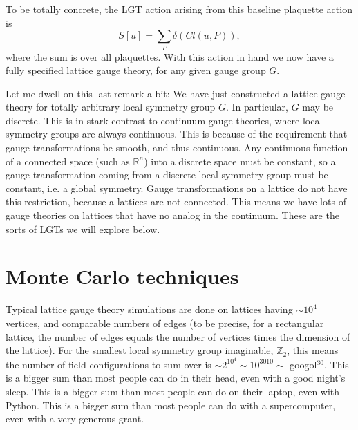 \documentclass[9pt,twocolumn,twoside]{article}
\begin{document}
To be totally concrete, the LGT action arising from this baseline plaquette action is 
\[S[u] = \sum_P \delta\left(Cl(u,P)\right),\]
where the sum is over all plaquettes.  With this action in hand we now have a fully specified lattice gauge theory, for any given gauge group $G$.  

Let me dwell on this last remark a bit: We have just constructed a lattice gauge theory for totally arbitrary local symmetry group $G$.  In particular, $G$ may be discrete.  This is in stark contrast to continuum gauge theories, where local symmetry groups are always continuous.  This is because of the requirement that gauge transformations be smooth, and thus continuous.  Any continuous function of a connected space (such as $\mathbb{R}^n$) into a discrete space must be constant, so a gauge transformation coming from a discrete local symmetry group must be constant, i.e. a global symmetry.  Gauge transformations on a lattice do not have this restriction, because a lattices are not connected.  This means we have lots of gauge theories on lattices that have no analog in the continuum.  These are the sorts of LGTs we will explore below. 

\section{Monte Carlo techniques}
Typical lattice gauge theory simulations are done on lattices having $\sim 10^4$ vertices, and comparable numbers of edges (to be precise, for a rectangular lattice, the number of edges equals the number of vertices times the dimension of the lattice).  For the smallest local symmetry group imaginable, $\mathbb{Z}_2$, this means the number of field configurations to sum over is $\sim 2^{10^4}\sim 10^{3010}\sim$ googol$^{30}$.  This is a bigger sum than most people can do in their head, even with a good night's sleep.  This is a bigger sum than most people can do on their laptop, even with Python.  This is a bigger sum than most people can do with a supercomputer, even with a very generous grant.  
\end{document}
